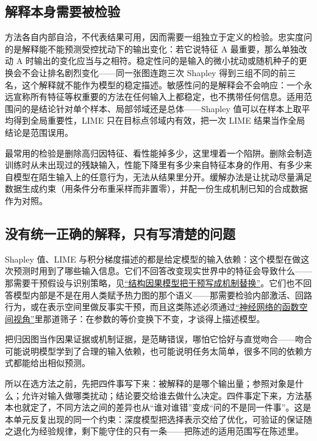 \subsection{解释本身需要被检验}

方法各自内部自洽，不代表结果可用，因而需要一组独立于定义的检验。忠实度问的是解释能不能预测受控扰动下的输出变化：若它说特征 A 最重要，那么单独改动 A 时输出的变化应当与之相符。稳定性问的是输入的微小扰动或随机种子的更换会不会让排名剧烈变化——同一张图连跑三次 Shapley 得到三组不同的前三名，这个解释就不能作为模型的稳定描述。敏感性问的是解释会不会响应：一个永远宣称所有特征等权重要的方法在任何输入上都稳定，也不携带任何信息。适用范围问的是结论针对单个样本、局部邻域还是总体——Shapley 值可以在样本上取平均得到全局重要性，LIME 只在目标点邻域内有效，把一次 LIME 结果当作全局结论是范围误用。

最常用的检验是删除高归因特征、看性能掉多少，这里埋着一个陷阱。删除会制造训练时从未出现过的残缺输入，性能下降里有多少来自特征本身的作用、有多少来自模型在陌生输入上的任意行为，无法从结果里分开。缓解办法是让扰动尽量满足数据生成约束（用条件分布重采样而非置零），并配一份生成机制已知的合成数据作为对照。

\subsection{没有统一正确的解释，只有写清楚的问题}

Shapley 值、LIME 与积分梯度描述的都是给定模型的输入依赖：这个模型在做这次预测时用到了哪些输入信息。它们不回答改变现实世界中的特征会导致什么——那需要干预假设与识别策略，见\hyperref[sec:13-Machine-Learning/12-Causal-Inference/02]{``结构因果模型把干预写成机制替换''}。它们也不回答模型内部是不是在用人类赋予热力图的那个语义——那需要检验内部激活、回路行为，或在表示空间里做反事实干预，而且这类陈述必须通过\hyperref[sec:14-Deep-Learning/10-Interpretability-Mathematics/01]{``神经网络的函数空间视角''}里那道筛子：在参数的等价变换下不变，才谈得上描述模型。

把归因图当作因果证据或机制证据，是范畴错误，哪怕它恰好与直觉吻合——吻合可能说明模型学到了合理的输入依赖，也可能说明任务太简单，很多不同的依赖方式都能给出相似预测。

所以在选方法之前，先把四件事写下来：被解释的是哪个输出量；参照对象是什么；允许对输入做哪类扰动；结论要交给谁去做什么决定。四件事定下来，方法基本也就定了，不同方法之间的差异也从``谁对谁错''变成``问的不是同一件事''。这是本单元反复出现的同一个约束：深度模型把选择表示交给了优化，可验证的保证随之退化为经验规律，剩下能守住的只有一条——把陈述的适用范围写在陈述里。
